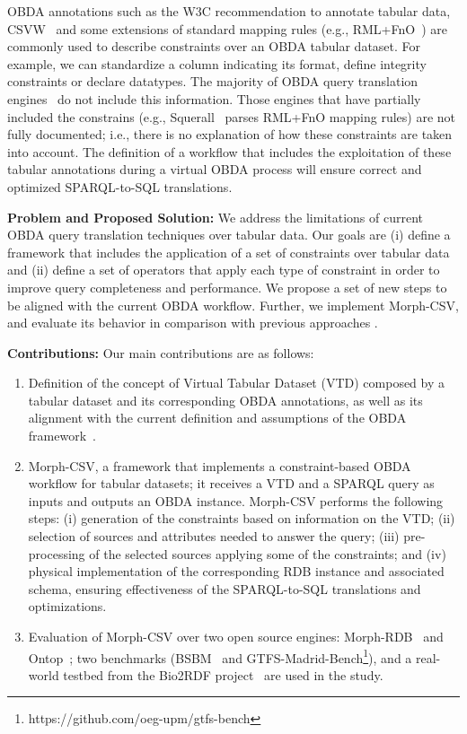 OBDA annotations such as the W3C recommendation to annotate tabular data, CSVW~\citep{tennison2015model} and some extensions of standard mapping rules (e.g., RML+FnO~\citep{de2017declarative}) are commonly used to describe constraints over an OBDA tabular dataset. For example, we can standardize a column indicating its format, define integrity constraints or declare datatypes. The majority of OBDA query translation engines~\citep{priyatna2014formalisation,endris2019ontario} do not include this information. Those engines that have partially included the constrains (e.g., Squerall~\citep{mami2019squerall} parses RML+FnO mapping rules) are not fully documented; i.e., there is no explanation of how these constraints are taken into account. The definition of a workflow that includes the exploitation of these tabular annotations during a virtual OBDA process will ensure correct and optimized SPARQL-to-SQL translations.

\noindent\textbf{Problem and Proposed Solution:} 
We address the limitations of current OBDA query translation techniques over tabular data. Our goals are (i) define a framework that includes the application of a set of constraints over tabular data and (ii) define a set of operators that apply each type of constraint in order to improve query completeness and performance. We propose a set of new steps to be aligned with the current OBDA workflow. Further, we implement Morph-CSV, and evaluate its behavior in comparison with previous approaches .


\noindent\textbf{Contributions:} Our main contributions are as follows:
\begin{enumerate}
\item Definition of the concept of Virtual Tabular Dataset (VTD) composed by a tabular dataset and its corresponding OBDA annotations, as well as its alignment with the current definition and assumptions of the OBDA framework~\citep{xiao2018obdasurvey}.
\item Morph-CSV, a framework that implements a constraint-based OBDA workflow for tabular datasets; it receives a VTD and a SPARQL query as inputs and outputs an OBDA instance. Morph-CSV performs the following steps: (i) generation of the constraints based on information on the VTD; (ii) selection of sources and attributes needed to answer the query; (iii) pre-processing of the selected sources applying some of the constraints; and (iv) physical implementation of the corresponding RDB instance and associated schema, ensuring effectiveness of the SPARQL-to-SQL translations and optimizations.
\item Evaluation of Morph-CSV over two open source engines: Morph-RDB~\citep{priyatna2014formalisation} and Ontop~\citep{calvanese2017ontop}; two benchmarks (BSBM~\citep{bizer2009berlin} and GTFS-Madrid-Bench\footnote{https://github.com/oeg-upm/gtfs-bench}), and a real-world testbed from the Bio2RDF project~\citep{belleau2008bio2rdf} are used in the study.
\end{enumerate}




